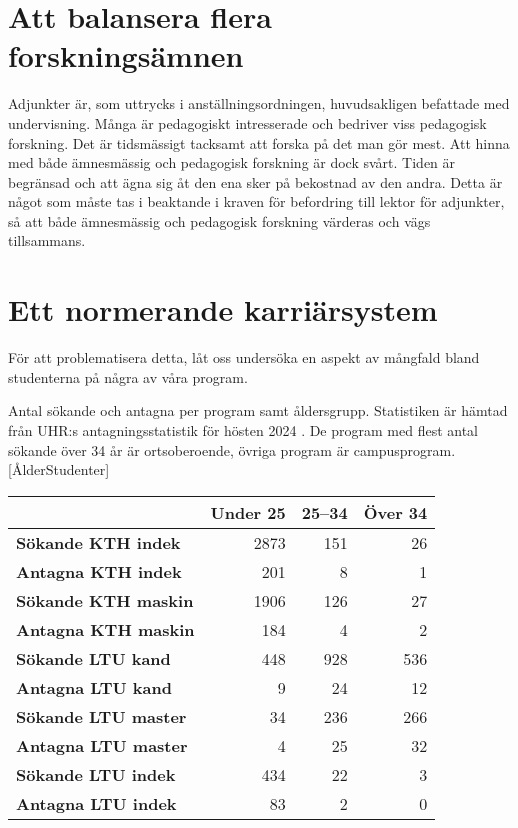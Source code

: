 \documentclass[a4paper,oneside,article,swedish]{memoir}
\let\section\chapter
\begin{document}
\section{Att balansera flera forskningsämnen}

Adjunkter är, som uttrycks i
anställningsordningen\autocite[avsnitt 1.5, ss.~20]{Anställningsordning},
huvudsakligen befattade med undervisning.
Många är pedagogiskt intresserade och bedriver viss pedagogisk forskning.
Det är tidsmässigt tacksamt att forska på det man gör mest.
Att hinna med både ämnesmässig och pedagogisk forskning är dock svårt.
Tiden är begränsad och att ägna sig åt den ena sker på bekostnad av den andra.
Detta är något som måste tas i beaktande i kraven för befordring till lektor 
för adjunkter, så att både ämnesmässig och pedagogisk forskning värderas och 
vägs tillsammans.


\section{Ett normerande karriärsystem}

För att problematisera detta,
låt oss undersöka en aspekt av mångfald bland studenterna på några av våra 
program.

\begin{table}
  \begin{sidecaption}{%
    Antal sökande och antagna per program samt åldersgrupp.
    Statistiken är hämtad från UHR:s antagningsstatistik för hösten 2024 
    \parencite{UHRstat}.
    De program med flest antal sökande över 34 år är ortsoberoende, övriga 
    program är campusprogram.
  }[ÅlderStudenter]
  \flushright
  \begin{tabular}{lrrr}
    \toprule
    & \textbf{Under 25} & \textbf{25--34} & \textbf{Över 34} \\
    \midrule
    \textbf{Sökande KTH indek} & 2873 & 151 & 26 \\
    \textbf{Antagna KTH indek} & 201 & 8 & 1 \\
    \midrule
    \textbf{Sökande KTH maskin} & 1906 & 126 & 27 \\
    \textbf{Antagna KTH maskin} & 184 & 4 & 2 \\
    \midrule
    \textbf{Sökande LTU kand} & 448 & 928 & 536 \\
    \textbf{Antagna LTU kand} & 9 & 24 & 12 \\
    \midrule
    \textbf{Sökande LTU master} & 34 & 236 & 266 \\
    \textbf{Antagna LTU master} & 4 & 25 & 32 \\
    \midrule
    \textbf{Sökande LTU indek} & 434 & 22 & 3 \\
    \textbf{Antagna LTU indek} & 83 & 2 & 0 \\
    \bottomrule
  \end{tabular}
  \end{sidecaption}
\end{table}
\end{document}
